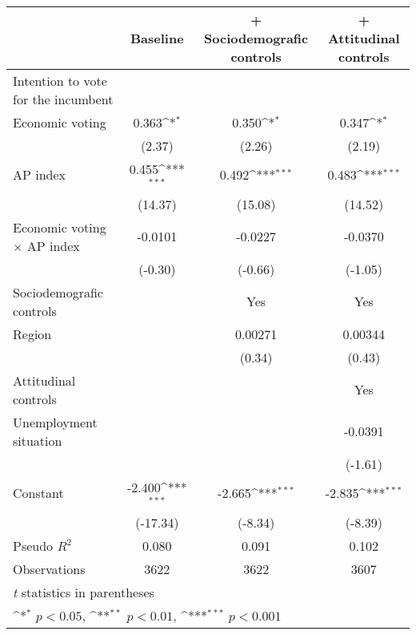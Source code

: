 {
\def\sym#1{\ifmmode^{#1}\else\(^{#1}\)\fi}
\begin{tabular}{l*{3}{c}}
\toprule
                & Baseline         &+ Sociodemografic controls         &+ Attitudinal controls         \\
\midrule
Intention to vote for the incumbent&                  &                  &                  \\
Economic voting &    0.363\sym{*}  &    0.350\sym{*}  &    0.347\sym{*}  \\
                &   (2.37)         &   (2.26)         &   (2.19)         \\
AP index        &    0.455\sym{***}&    0.492\sym{***}&    0.483\sym{***}\\
                &  (14.37)         &  (15.08)         &  (14.52)         \\
Economic voting $\times$ AP index&  -0.0101         &  -0.0227         &  -0.0370         \\
                &  (-0.30)         &  (-0.66)         &  (-1.05)         \\
Sociodemografic controls&                  &      Yes         &      Yes         \\
Region          &                  &  0.00271         &  0.00344         \\
                &                  &   (0.34)         &   (0.43)         \\
Attitudinal controls&                  &                  &      Yes         \\
Unemployment situation&                  &                  &  -0.0391         \\
                &                  &                  &  (-1.61)         \\
Constant        &   -2.400\sym{***}&   -2.665\sym{***}&   -2.835\sym{***}\\
                & (-17.34)         &  (-8.34)         &  (-8.39)         \\
\midrule
Pseudo \(R^{2}\)&    0.080         &    0.091         &    0.102         \\
Observations    &     3622         &     3622         &     3607         \\
\bottomrule
\multicolumn{4}{l}{\footnotesize \textit{t} statistics in parentheses}\\
\multicolumn{4}{l}{\footnotesize \sym{*} \(p<0.05\), \sym{**} \(p<0.01\), \sym{***} \(p<0.001\)}\\
\end{tabular}
}
